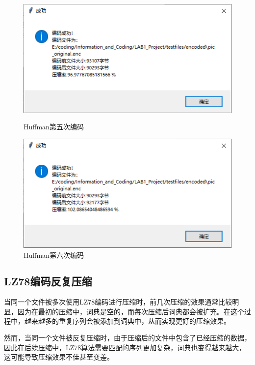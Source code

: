 \documentclass[12pt, a4paper]{ctexart}
\begin{document}
    \begin{figure}[H]
    \centering
    \begin{minipage}[t]{0.45\textwidth}
    \centering
    \includegraphics[width=\textwidth]{./pic/11-5.png}
    \caption{Huffman第五次编码}
    \end{minipage}
    \hfill
    \begin{minipage}[t]{0.45\textwidth}
    \centering
    \includegraphics[width=\textwidth]{./pic/11-6.png}
    \caption{Huffman第六次编码}
    \end{minipage}
    \end{figure}


    \subsection{LZ78编码反复压缩}

    当同一个文件被多次使用LZ78编码进行压缩时，前几次压缩的效果通常比较明显，因为在最初的压缩中，词典是空的，而每次压缩后词典都会被扩充。在这个过程中，越来越多的重复序列会被添加到词典中，从而实现更好的压缩效果。

    然而，当同一个文件被反复压缩时，由于压缩后的文件中包含了已经压缩的数据，因此在后续压缩中，LZ78算法需要匹配的序列更加复杂，词典也变得越来越大，这可能导致压缩效果不佳甚至变差。
\end{document}
